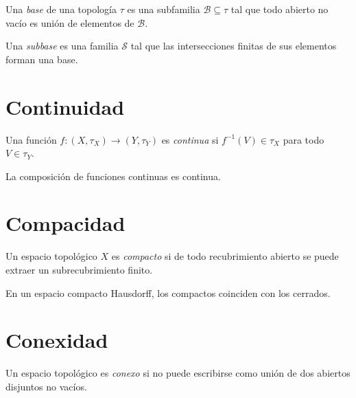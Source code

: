 \begin{definition}
\label{def:base-topologia}
Una \emph{base} de una topología $\tau$ es una subfamilia $\mathcal{B}\subseteq\tau$ tal que todo abierto no vacío es unión de elementos de $\mathcal{B}$.
\end{definition}

\begin{definition}
\label{def:subbase}
Una \emph{subbase} es una familia $\mathcal{S}$ tal que las intersecciones finitas de sus elementos forman una base.
\end{definition}

\section{Continuidad}

\begin{definition}
\label{def:continuidad-topologica}
Una función $f\colon(X,\tau_X)\to(Y,\tau_Y)$ es \emph{continua} si $f^{-1}(V)\in\tau_X$ para todo $V\in\tau_Y$.
\end{definition}

\begin{proposition}
\label{prop:comp-topologica}
La composición de funciones continuas es continua.
\end{proposition}

\section{Compacidad}

\begin{definition}
\label{def:compacto-topologia}
Un espacio topológico $X$ es \emph{compacto} si de todo recubrimiento abierto se puede extraer un subrecubrimiento finito.
\end{definition}

\begin{theorem}
\label{teo:compacto-cerrado}
En un espacio compacto Hausdorff, los compactos coinciden con los cerrados.
\end{theorem}

\section{Conexidad}

\begin{definition}
\label{def:conexo-topologia}
Un espacio topológico es \emph{conexo} si no puede escribirse como unión de dos abiertos disjuntos no vacíos.
\end{definition}

